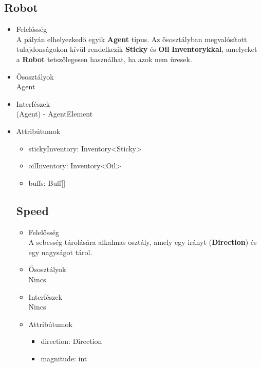 \subsection{Robot}
\begin{itemize}

\item Felelősség\\
    A pályán elhelyezkedő egyik \textbf{Agent} típus. Az ősosztályban megvalósított tulajdonságokon kívül rendelkezik \textbf{Sticky} és \textbf{Oil} \textbf{Inventorykkal}, amelyeket a \textbf{Robot} tetszőlegesen használhat, ha azok nem üresek.

\item Ősosztályok\\
Agent

\item Interfészek\\
(Agent) - AgentElement

\item Attribútumok\\
\begin{itemize}
    \item stickyInventory: Inventory<Sticky>
    \item oilInventory: Inventory<Oil>
    \item buffs: Buff[]
\end{itemize}

\subsection{Speed}
\begin{itemize}

\item Felelősség\\
    A sebesség tárolására alkalmas osztály, amely egy irányt (\textbf{Direction}) és egy nagyságot tárol.

\item Ősosztályok\\
Nincs

\item Interfészek\\
Nincs

\item Attribútumok\\
\begin{itemize}
    \item direction: Direction
    \item magnitude: int


\end{itemize}
\end{itemize}
\end{itemize}
